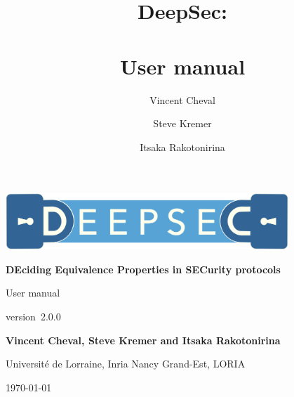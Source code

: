 \documentclass[a4paper,11pt]{article}
\title{DeepSec:\\\\User manual}
\author[1]{Vincent Cheval}
\author[1]{Steve Kremer}
\author[1]{Itsaka Rakotonirina}
\affil[2]{Inria Nancy, LORIA, Universit\'e de Lorraine, France}
\newcommand{\version}{2.0.0}
\begin{document}
\begin{titlepage}

  \color{titlepagetextcolor}
  \begin{center}
    \vspace*{1cm}
    \pagecolor{titlepagebgcolor}
    
    \includegraphics[width=0.8\textwidth]{logo/logo-full.png}
    
    
    \textbf{DEciding Equivalence Properties in SECurity protocols}
    
    \vspace{0.5cm}
    {\Large User manual}

    version~\version
    
    \vspace{1.5cm}
    
    \textbf{Vincent Cheval, Steve Kremer and Itsaka Rakotonirina}

    \medskip
    Université de Lorraine, Inria Nancy Grand-Est, LORIA
    
    \medskip
    
    \today
       
                   
     \end{center}
   \color{black}
 \end{titlepage}

\pagecolor{white}



\newpage

\tableofcontents

\newpage

 \newpage
 \newpage
 \newpage
 \newpage
 \newpage

\printbibliography
\end{document}
